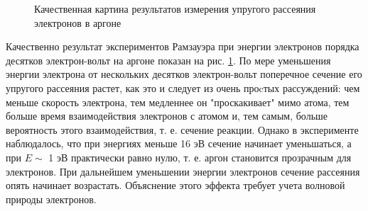 \documentclass[12pt,a4paper]{article}
\begin{document}
\begin{figure} \label{graph} 
\vspace{-5ex}  
\caption{Качественная картина ре­зультатов измерения упругого рассеяния электронов в аргоне}
\end{figure}
Качественно результат экспериментов Рамзауэра при энергии электронов по­рядка десятков электрон-вольт на аргоне показан на рис. \ref{graph}. По мере уменьшения энергии электрона от нескольких десятков электрон-вольт поперечное сечение его упругого рассеяния растет, как это и следует из очень про­cтых рассуждений: чем меньше скорость электрона, тем медленнее он "проскакивает" мимо атома, тем больше время взаимодействия электро­нов с атомом и, тем самым, больше вероятность этого взаимодействия, т. е. сечение реакции. Однако в эксперименте наблюдалось, что при энергиях меньше 16 эВ сечение начинает уменьшаться, а при $E \sim $ 1 эВ практически равно нулю, т. е. аргон становится прозрачным для элек­тронов. При дальнейшем уменьшении энергии электронов сечение рас­сеяния опять начинает возрастать. Объяснение этого эффекта требует  учета волновой природы электронов. \\
\end{document}
